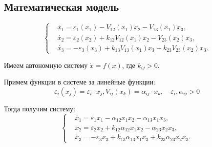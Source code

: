  \subsection{Математическая модель}
    \[
        \left\{\begin{split}
            & \dot{x_1} = \varepsilon_1(x_1) - V_{12}(x_1)x_2 - V_{13}(x_1)x_3, \\
            & \dot{x_2} = \varepsilon_2(x_2) + k_{12} V_{12}(x_1)x_2 - V_{23}(x_2)x_3, \\
            & \dot{x_3} = -\varepsilon_3(x_3) + k_{13} V_{13}(x_1)x_3 + k_{23} V_{23}(x_2)x_3. 
        \end{split}\right.
    \]
    
    Имеем автономную систему \( \dot{x} = f(x) \), где \( k_{ij} > 0 \).

    Примем функции в системе за линейные функции: 
    \[ \varepsilon_i(x_j) = \varepsilon_i \cdot x_j, V_{ij}(x_k) = \alpha_{ij} \cdot x_k, \quad \varepsilon_i, \alpha_{ij} > 0 \]

    Тогда получим систему:
    \[
        \left\{\begin{split}
            & \dot{x_1} = \varepsilon_1 x_1 - \alpha_{12} x_1 x_2 - \alpha_{13} x_1 x_3, \\
            & \dot{x_2} = \varepsilon_2 x_2 + k_{12} \alpha_{12} x_1 x_2 - \alpha_{23} x_2 x_3, \\
            & \dot{x_3} = -\varepsilon_3 x_3 + k_{13} \alpha_{13} x_1 x_3 + k_{23} \alpha_{23} x_2 x_3. 
        \end{split}\right.
    \]